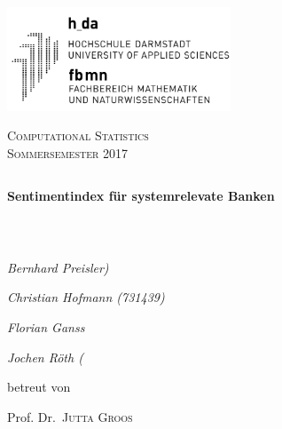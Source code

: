 \topmargin-15mm
\textwidth147mm

\topmargin-15mm
\textwidth147mm

\setlength{\parindent}{0pt}

\renewcommand{\footrulewidth}{0.8pt}

\begin{titlepage}
	\text{}\vspace{-0.15cm}\\
	\begin{center}\hspace{-1.15cm} 
		\includegraphics[width=0.5\textwidth]{logo.png} 
	\end{center}
	
	\vspace{1.0cm}
	
	\vspace{0.25cm}
	
	\begin{center}\Large{\textsc{Computational Statistics\\Sommersemester 2017}}
	\end{center}\vspace{3.7cm}
	
	\begin{tabularx}
		{\textwidth}{l}
		\hline
	\end{tabularx}
	
	\begin{center}
		\LARGE{\textbf{Sentimentindex für systemrelevate Banken}}
	\end{center}
	
	\begin{tabularx}
		{\textwidth}{l}
		\hline
	\end{tabularx}\vspace{1.4cm}\\
	
	
	\begin{center}
		{\Large\itshape Bernhard Preisler)\par}
		{\Large\itshape Christian Hofmann (731439)\par}
		{\Large\itshape Florian Ganss\par}
		{\Large\itshape Jochen Röth (\par}
	\end{center}
	\vfill
	betreut von\par
	Prof. Dr.~\textsc{Jutta Groos}
	

\end{titlepage}
